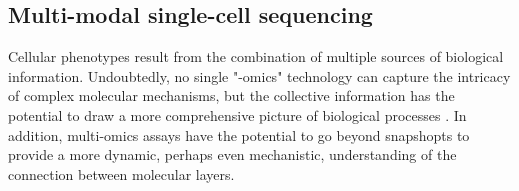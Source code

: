\subsection{Multi-modal single-cell sequencing} \label{section:single_cell_multi_modal}
Cellular phenotypes result from the combination of multiple sources of biological information. Undoubtedly, no single "-omics" technology can capture the intricacy of complex molecular mechanisms, but the collective information has the potential to draw a more comprehensive picture of biological processes \cite{Hasin2017,Ritchie2015}. In addition, multi-omics assays have the potential to go beyond snapshopts to provide a more dynamic, perhaps even mechanistic, understanding of the connection between molecular layers.



